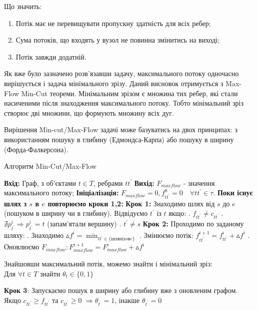 Що значить:
\begin{enumerate}
    \item Потік має не перевищувати пропускну здатність для всіх ребер;
    \item Сума потоків, що входять у вузол не повинна змінитись на виході;
    \item Потік завжди додатній.
\end{enumerate}

Як вже було зазначено розв'язавши задачу, максимального потоку одночасно вирішується і задача
мінімального зрізу. Даний висновок отримується з Max-Flow Min-Cut теореми.
Мінімальним зрізом є множина тих ребер, які стали насиченими після знаходження максимального
потоку. Тобто мінімальний зріз створює дві множини, що формують множину всіх дуг.



Вирішення Min-cut/Max-Flow задачі може базуватись на двох принципах:
з використанням пошуку в глибину (Едмондса-Карпа) або пошуку в ширину (Форда-Фалкерсона).

\begin{algorithm}[H]
    \caption{Алгоритм Min-Cut/Max-Flow}
    \begin{algorithmic}
        \State \textbf{Вхід:} Граф, з об'єктами $ t \in T $, ребрами $tt^{'} $
        \State \textbf{Вихід:} $ F_{maxflow} $ - значення максимального потоку;
        \State \textbf{Ініціалізація:} $ F_{maxflow} = 0, f_{tt^{'}}^{0} = 0 \quad \forall tt^{'}  \in \tau $.
        \State \textbf{Поки існує шлях з $s$ в $e$ повторюємо кроки 1,2:}
        \State \textbf{Крок 1:} Знаходимо шлях від $s$ до $e$ (пошуком в ширину чи в глибину).
        \State Відвідуємо $ t^{'}$ із $t $ якщо:
        \State {}. $ f_{tt^{'}} \neq c_{tt^{'}} $
        \State {}. $ \nexists p_{t^{'}}^{i} \Rightarrow p_{t^{'}}^{i} = t $ (запам'ятали вершину)
        \State {}. $ t^{'} \neq s $
        \State \textbf{Крок 2:} Проходимо по заданому шляху:
        \State {}. Знаходимо $ \vartriangle f^{i} = \min_{tt^{'} \in \{шлях із s в e \}} $
        \State {}. Змінюємо потік: $ f_{tt^{'}}^{i+1} = f_{tt^{'}}^{i} + \vartriangle f^{i} $
        \State {}. Оновлюємо $ F_{maxflow}: F_{maxflow}^{i+1} = F_{maxflow}^{i} + \vartriangle f^{i} $
    \end{algorithmic}

    Знайшовши максимальний потік, можемо знайти і мінімальний зріз: \\
    Для $\forall t \in T$ знайти $\theta_{t} \in \{0,1\}$
    \begin{algorithmic}
        \State \textbf{Крок 3}: Запускаємо пошук в ширину або глибину вже з оновленим графом.
        \State \qquad Якщо $c_{tt^{'}} \geqslant f_{tt^{'}}$ та $c_{tt^{'}} \geqslant 0$
        $\Rightarrow \theta_{t^{'}} = 1 $, інакше $\theta_{t^{'}} = 0 $
    \end{algorithmic}
\end{algorithm}

